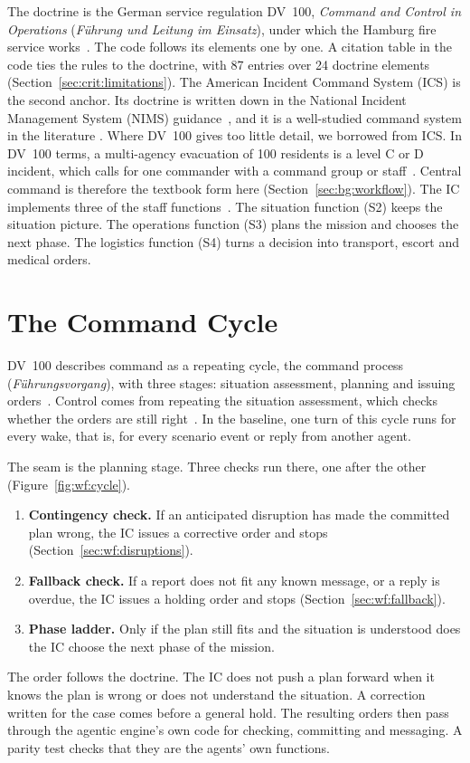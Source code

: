 The doctrine is the German service regulation DV~100, \emph{Command and Control
in Operations} (\emph{Führung und Leitung im Einsatz}), under which the Hamburg
fire service works~\cite{fwdv100}. The code follows its elements one by one. A
citation table in the code ties the rules to the doctrine, with 87 entries over
24 doctrine elements (Section~\ref{sec:crit:limitations}).
The American Incident Command System (ICS) is the second anchor. Its doctrine is
written down in the National Incident Management System (NIMS)
guidance~\cite{fema2017}, and it is a well-studied
command system in the literature
\parencite{buck2006,chang2017}. Where
DV~100 gives too little detail, we borrowed from ICS. In DV~100 terms, a multi-agency evacuation of 100
residents is a level C or D incident, which calls for one commander with a
command group or staff~\cite[23]{fwdv100}. Central command is therefore the
textbook form here (Section~\ref{sec:bg:workflow}). The IC implements three of the staff
functions~\cite[13--14]{fwdv100}. The situation function (S2) keeps the
situation picture. The operations function (S3) plans the mission and chooses
the next phase. The logistics function (S4) turns a decision into transport,
escort and medical orders.

\section{The Command Cycle}
\label{sec:wf:cycle}

DV~100 describes command as a repeating cycle, the command process
(\emph{Führungsvorgang}), with three stages: situation assessment, planning and
issuing orders~\cite[24--25]{fwdv100}. Control comes from repeating the
situation assessment, which checks whether the orders are still
right~\cite[24]{fwdv100}. In the baseline, one turn of this cycle runs for
every wake, that is, for every scenario event or reply from another agent.

The seam is the planning stage. Three checks run there, one after the other
(Figure~\ref{fig:wf:cycle}).
\begin{enumerate}
  \item \textbf{Contingency check.} If an anticipated disruption has made the
  committed plan wrong, the IC issues a corrective order and stops
  (Section~\ref{sec:wf:disruptions}).
  \item \textbf{Fallback check.} If a report does not fit any known message,
  or a reply is overdue, the IC issues a holding order and stops
  (Section~\ref{sec:wf:fallback}).
  \item \textbf{Phase ladder.} Only if the plan still fits and the situation
  is understood does the IC choose the next phase of the mission.
\end{enumerate}
The order follows the doctrine. The IC does not push a plan forward when it
knows the plan is wrong or does not understand the situation. A correction
written for the case comes before a general hold. The resulting orders then
pass through the agentic engine's own code for checking, committing and
messaging. A parity test checks that they are the agents' own functions.

